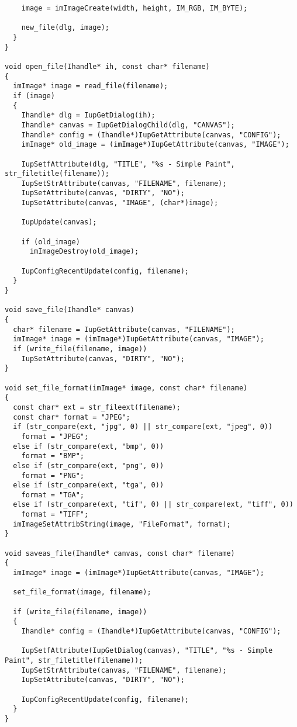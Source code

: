 \documentclass{ctexart}
\begin{document}
\begin{lstlisting}
    image = imImageCreate(width, height, IM_RGB, IM_BYTE);

    new_file(dlg, image);
  }
}

void open_file(Ihandle* ih, const char* filename)
{
  imImage* image = read_file(filename);
  if (image)
  {
    Ihandle* dlg = IupGetDialog(ih);
    Ihandle* canvas = IupGetDialogChild(dlg, "CANVAS");
    Ihandle* config = (Ihandle*)IupGetAttribute(canvas, "CONFIG");
    imImage* old_image = (imImage*)IupGetAttribute(canvas, "IMAGE");

    IupSetfAttribute(dlg, "TITLE", "%s - Simple Paint", str_filetitle(filename));
    IupSetStrAttribute(canvas, "FILENAME", filename);
    IupSetAttribute(canvas, "DIRTY", "NO");
    IupSetAttribute(canvas, "IMAGE", (char*)image);

    IupUpdate(canvas);

    if (old_image)
      imImageDestroy(old_image);

    IupConfigRecentUpdate(config, filename);
  }
}

void save_file(Ihandle* canvas)
{
  char* filename = IupGetAttribute(canvas, "FILENAME");
  imImage* image = (imImage*)IupGetAttribute(canvas, "IMAGE");
  if (write_file(filename, image))
    IupSetAttribute(canvas, "DIRTY", "NO");
}

void set_file_format(imImage* image, const char* filename)
{
  const char* ext = str_fileext(filename);
  const char* format = "JPEG";
  if (str_compare(ext, "jpg", 0) || str_compare(ext, "jpeg", 0))
    format = "JPEG";
  else if (str_compare(ext, "bmp", 0))
    format = "BMP";
  else if (str_compare(ext, "png", 0))
    format = "PNG";
  else if (str_compare(ext, "tga", 0))
    format = "TGA";
  else if (str_compare(ext, "tif", 0) || str_compare(ext, "tiff", 0))
    format = "TIFF";
  imImageSetAttribString(image, "FileFormat", format);
}

void saveas_file(Ihandle* canvas, const char* filename)
{
  imImage* image = (imImage*)IupGetAttribute(canvas, "IMAGE");

  set_file_format(image, filename);

  if (write_file(filename, image))
  {
    Ihandle* config = (Ihandle*)IupGetAttribute(canvas, "CONFIG");
  
    IupSetfAttribute(IupGetDialog(canvas), "TITLE", "%s - Simple Paint", str_filetitle(filename));
    IupSetStrAttribute(canvas, "FILENAME", filename);
    IupSetAttribute(canvas, "DIRTY", "NO");

    IupConfigRecentUpdate(config, filename);
  }
}


\end{lstlisting}
\end{document}
